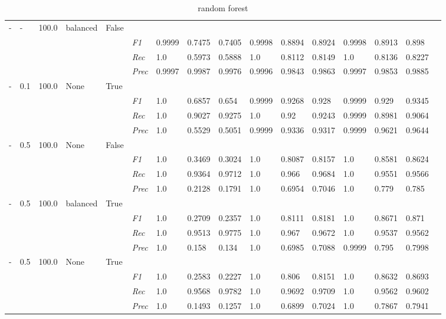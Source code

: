 \begin{table}[]
\begin{tabularx}{\textwidth}{XXXXX|X|XXX|XXX|XXXX}
- & - & 100.0 & balanced & False& & & & & & & & & \\
& & & & & \textit{F1} & 0.9999 & 0.7475 & 0.7405 & 0.9998 & 0.8894        & 0.8924        & 0.9998        & 0.8913        & 0.898        \\
& & & & & \textit{Rec} & 1.0 & 0.5973 & 0.5888    & 1.0 & 0.8112    & 0.8149    & 1.0    & 0.8136    & 0.8227    \\
& & & & & \textit{Prec} & 0.9997 & 0.9987 & 0.9976 & 0.9996 & 0.9843 & 0.9863 & 0.9997 & 0.9853 & 0.9885 \\ \midrule
- & 0.1 & 100.0 & None & True& & & & & & & & & \\
& & & & & \textit{F1} & 1.0 & 0.6857 & 0.654 & 0.9999 & 0.9268        & 0.928        & 0.9999        & 0.929        & 0.9345        \\
& & & & & \textit{Rec} & 1.0 & 0.9027 & 0.9275    & 1.0 & 0.92    & 0.9243    & 0.9999    & 0.8981    & 0.9064    \\
& & & & & \textit{Prec} & 1.0 & 0.5529 & 0.5051 & 0.9999 & 0.9336 & 0.9317 & 0.9999 & 0.9621 & 0.9644 \\ \midrule
- & 0.5 & 100.0 & None & False& & & & & & & & & \\
& & & & & \textit{F1} & 1.0 & 0.3469 & 0.3024 & 1.0 & 0.8087        & 0.8157        & 1.0        & 0.8581        & 0.8624        \\
& & & & & \textit{Rec} & 1.0 & 0.9364 & 0.9712    & 1.0 & 0.966    & 0.9684    & 1.0    & 0.9551    & 0.9566    \\
& & & & & \textit{Prec} & 1.0 & 0.2128 & 0.1791 & 1.0 & 0.6954 & 0.7046 & 1.0 & 0.779 & 0.785 \\ \midrule
- & 0.5 & 100.0 & balanced & True& & & & & & & & & \\
& & & & & \textit{F1} & 1.0 & 0.2709 & 0.2357 & 1.0 & 0.8111        & 0.8181        & 1.0        & 0.8671        & 0.871        \\
& & & & & \textit{Rec} & 1.0 & 0.9513 & 0.9775    & 1.0 & 0.967    & 0.9672    & 1.0    & 0.9537    & 0.9562    \\
& & & & & \textit{Prec} & 1.0 & 0.158 & 0.134 & 1.0 & 0.6985 & 0.7088 & 0.9999 & 0.795 & 0.7998 \\ \midrule
- & 0.5 & 100.0 & None & True& & & & & & & & & \\
& & & & & \textit{F1} & 1.0 & 0.2583 & 0.2227 & 1.0 & 0.806        & 0.8151        & 1.0        & 0.8632        & 0.8693        \\
& & & & & \textit{Rec} & 1.0 & 0.9568 & 0.9782    & 1.0 & 0.9692    & 0.9709    & 1.0    & 0.9562    & 0.9602    \\
& & & & & \textit{Prec} & 1.0 & 0.1493 & 0.1257 & 1.0 & 0.6899 & 0.7024 & 1.0 & 0.7867 & 0.7941 \\ \midrule
\end{tabularx}
\caption{random forest}
\label{tab:all_results_random_forest}
\end{table}

